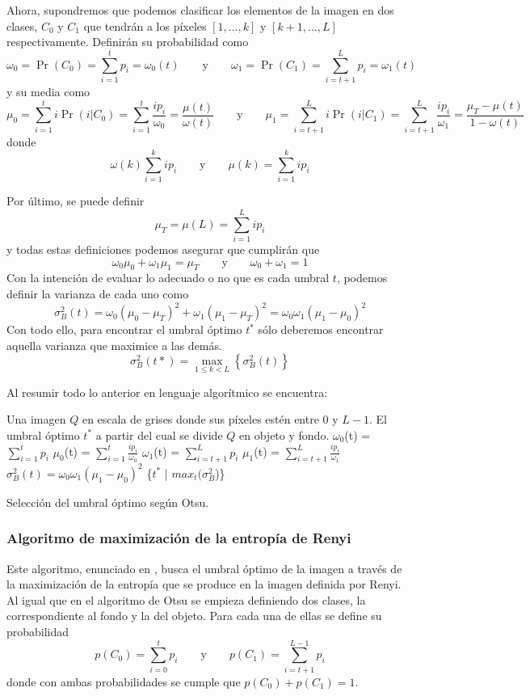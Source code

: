 Ahora, supondremos que podemos clasificar los elementos de la imagen en dos clases, $C_0$ y $C_1$ que tendrán a los píxeles $[1,\dots,k]$ y $[k+1,\dots,L]$ respectivamente. Definirán su probabilidad como
$$\omega_0 = \Pr(C_0) = \sum_{i=1}^{t}p_i=\omega_0(t)\qquad\text{y}\qquad
\omega_1 = \Pr(C_1) = \sum_{i=t+1}^{L}p_i=\omega_1(t)$$
y su media como
$$\mu_0=\sum_{i=1}^t i \Pr(i|C_0) = \sum_{i=1}^t \frac{ip_i}{\omega_0} = \frac{\mu(t)}{\omega(t)}\qquad\text{y}\qquad
\mu_1=\sum_{i=t+1}^{L} i \Pr(i|C_1) = \sum_{i=t+1}^{L} \frac{ip_i}{\omega_1} = \frac{\mu_T-\mu(t)}{1-\omega(t)}$$
donde
$$\omega(k)\sum_{i=1}^k ip_i   \qquad\text{y}\qquad   \mu(k)=\sum_{i=1}^k ip_i$$

Por último, se puede definir
$$\mu_T = \mu(L) = \sum_{i=1}^L ip_i$$
y todas estas definiciones podemos asegurar que cumplirán que
$$\omega_0\mu_0+\omega_1\mu_1 = \mu_T   \qquad\text{y}\qquad   \omega_0+\omega_1 = 1$$
Con la intención de evaluar lo adecuado o no que es cada umbral $t$, podemos definir la varianza de cada uno como 
$$\sigma_B^2(t) = \omega_0(\mu_0-\mu_T)^2 + \omega_1(\mu_1-\mu_T)^2 = \omega_0\omega_1(\mu_1-\mu_0)^2$$
Con todo ello, para encontrar el umbral óptimo $t^*$ sólo deberemos encontrar aquella varianza que maximice a las demás. 
$$\sigma_B^2(t*) = \max_{1\leq k <L}\left\{\sigma_B^2(t)\right\}$$

Al resumir todo lo anterior en lenguaje algorítmico se encuentra:

\begin{algorithm}
\begin{algorithmic}[1]
\REQUIRE Una imagen $Q$ en escala de grises donde sus píxeles estén entre $0$ y $L-1$.
\ENSURE El umbral óptimo $t^*$ a partir del cual se divide $Q$ en objeto y fondo.
\STATE $\omega_0$(t) = $\sum_{i=1}^{t}p_i$
\STATE $\mu_0$(t) = $\sum_{i=1}^t \frac{ip_i}{\omega_0}$
\STATE $\omega_1$(t) = $\sum_{i=t+1}^{L}p_i$
\STATE $\mu_1$(t) = $\sum_{i=t+1}^L \frac{ip_i}{\omega_1}$
\STATE $\sigma_B^2(t) = \omega_0\omega_1(\mu_1-\mu_0)^2$
\ENDFOR
\RETURN \{$t^*$ | $max_t(\sigma_B^2$)\}
\end{algorithmic}
\caption{Selección del umbral óptimo según Otsu.}\label{alg:otsu}
\end{algorithm}


\subsubsection{Algoritmo de maximización de la entropía de Renyi}\label{sec:algoritmorenyi}
Este algoritmo, enunciado en \cite{art:sahoo}, busca el umbral óptimo de la imagen a través de la maximización de la entropía que se produce en la imagen definida por Renyi. Al igual que en el algoritmo de Otsu se empieza definiendo dos clases, la correspondiente al fondo y la del objeto. Para cada una de ellas se define su probabilidad
$$p(C_0)=\sum_{i=0}^{t}p_i\qquad\text{y}\qquad p(C_1)=\sum_{i=t+1}^{L-1}p_i$$
donde con ambas probabilidades se cumple que $p(C_0)+p(C_1)=1$.


